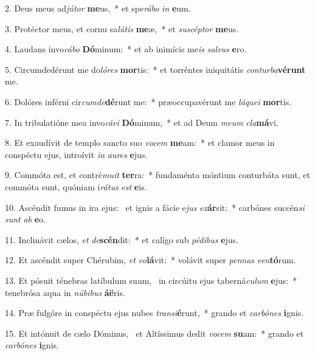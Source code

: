 2. Deus meus ad\textit{jú}\textit{tor} \textbf{me}us,~*  et spe\textit{rá}\textit{bo} \textit{in} \textbf{e}um.\

3. Protéctor meus, et cornu sa\textit{lú}\textit{tis} \textbf{me}æ,~*  et \textit{su}\textit{scép}\textit{tor} \textbf{me}us.\

4. Laudans invo\textit{cá}\textit{bo} \textbf{Dó}minum:~*  et ab inimícis me\textit{is} \textit{sal}\textit{vus} \textbf{e}ro.\

5. Circumdedérunt me do\textit{ló}\textit{res} \textbf{mor}tis:~*  et torréntes iniquitátis \textit{con}\textit{tur}\textit{ba}\textbf{vé}\textbf{runt} me.\

6. Dolóres inférni cir\textit{cum}\textit{de}\textbf{dé}runt me:~*  præoccupavérunt me \textit{lá}\textit{que}\textit{i} \textbf{mor}tis.\

7. In tribulatióne mea invo\textit{cá}\textit{vi} \textbf{Dó}minum,~*  et ad Deum \textit{me}\textit{um} \textit{cla}\textbf{má}vi.\

8. Et exaudívit de templo sancto suo \textit{vo}\textit{cem} \textbf{me}am:~*  et clamor meus in conspéctu ejus, introívit \textit{in} \textit{au}\textit{res} \textbf{e}jus.\

9. Commóta est, et contré\textit{mu}\textit{it} \textbf{ter}ra:~*  fundaménta móntium conturbáta sunt, et commóta sunt, quóniam i\textit{rá}\textit{tus} \textit{est} \textbf{e}is.\

10. Ascéndit fumus in ira ejus: \dag\  et ignis a fácie e\textit{jus} \textit{ex}\textbf{ár}sit:~*  carbónes succén\textit{si} \textit{sunt} \textit{ab} \textbf{e}o.\

11. Inclinávit cælos, \textit{et} \textit{de}\textbf{scén}dit:~*  et calígo sub \textit{pé}\textit{di}\textit{bus} \textbf{e}jus.\

12. Et ascéndit super Chérubim, \textit{et} \textit{vo}\textbf{lá}vit:~*  volávit super \textit{pen}\textit{nas} \textit{ven}\textbf{tó}rum.\

13. Et pósuit ténebras latíbulum suum, \dag\  in circúitu ejus taberná\textit{cu}\textit{lum} \textbf{e}jus:~*  tenebrósa aqua in \textit{nú}\textit{bi}\textit{bus} \textbf{á}\textbf{ë}ris.\

14. Præ fulgóre in conspéctu ejus nubes \textit{trans}\textit{i}\textbf{é}runt,~*  grando et \textit{car}\textit{bó}\textit{nes} \textbf{i}gnis.\

15. Et intónuit de cælo Dóminus, \dag\  et Altíssimus dedit \textit{vo}\textit{cem} \textbf{su}am:~*  grando et \textit{car}\textit{bó}\textit{nes} \textbf{i}gnis.\

